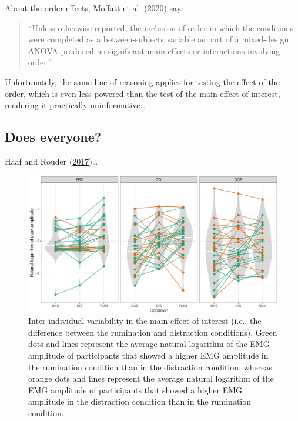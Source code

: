 \documentclass[
  english,
  man,floatsintext]{apa6}
\begin{document}
About the order effects, Moffatt et al. (\protect\hyperlink{ref-moffatt_inner_2020}{2020}) say:

\begin{quote}
``Unless otherwise reported, the inclusion of order in which the conditions were completed as a between-subjects variable as part of a mixed-design ANOVA produced no significant main effects or interactions involving order.''
\end{quote}

Unfortunately, the same line of reasoning applies for testing the effect of the order, which is even less powered than the test of the main effect of interest, rendering it practically uninformative\ldots{}

\hypertarget{does-everyone}{%
\subsection{Does everyone?}\label{does-everyone}}

Haaf and Rouder (\protect\hyperlink{ref-haaf_developing_2017}{2017})\ldots{}

\begin{figure}[!htb]

{\centering \includegraphics[width=1\linewidth]{reanalysis_files/figure-latex/everyone-1} 

}

\caption{Inter-individual variability in the main effect of interest (i.e., the difference between the rumination and distraction conditions). Green dots and lines represent the average natural logarithm of the EMG amplitude of participants that showed a higher EMG amplitude in the rumination condition than in the distraction condition, whereas orange dots and lines represent the average natural logarithm of the EMG amplitude of participants that showed a higher EMG amplitude in the distraction condition than in the rumination condition.}\label{fig:everyone}
\end{figure}
\end{document}
